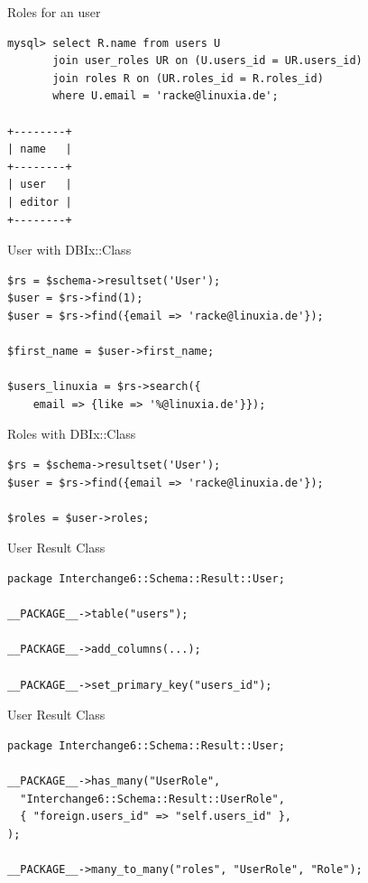 \begin{frame}[fragile]{Roles for an user}
\begin{lstlisting}
mysql> select R.name from users U
       join user_roles UR on (U.users_id = UR.users_id)
       join roles R on (UR.roles_id = R.roles_id)
       where U.email = 'racke@linuxia.de';

+--------+
| name   |
+--------+
| user   |
| editor |
+--------+
\end{lstlisting}
\end{frame}

\begin{frame}[fragile]{User with DBIx::Class}
\begin{lstlisting}
$rs = $schema->resultset('User');
$user = $rs->find(1);
$user = $rs->find({email => 'racke@linuxia.de'});

$first_name = $user->first_name;

$users_linuxia = $rs->search({
    email => {like => '%@linuxia.de'}});
\end{lstlisting}
\end{frame}

\begin{frame}[fragile]{Roles with DBIx::Class}
\begin{lstlisting}
$rs = $schema->resultset('User');
$user = $rs->find({email => 'racke@linuxia.de'});

$roles = $user->roles;
\end{lstlisting}
\end{frame}

\begin{frame}[fragile]{User Result Class}
\begin{lstlisting}
package Interchange6::Schema::Result::User;

__PACKAGE__->table("users");

__PACKAGE__->add_columns(...);

__PACKAGE__->set_primary_key("users_id");

\end{lstlisting}
\end{frame}


\begin{frame}[fragile]{User Result Class}
\begin{lstlisting}
package Interchange6::Schema::Result::User;

__PACKAGE__->has_many("UserRole",
  "Interchange6::Schema::Result::UserRole",
  { "foreign.users_id" => "self.users_id" },
);

__PACKAGE__->many_to_many("roles", "UserRole", "Role");
\end{lstlisting}
\end{frame}

